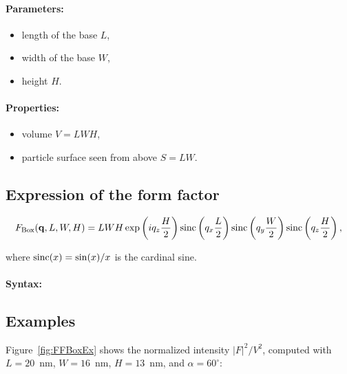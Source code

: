 \FloatBarrier


\paragraph{Parameters:}
\begin{itemize}
\item length of the base $L$,
\item width of the base $W$,
\item height  $H$.
\end{itemize}

\paragraph{Properties:}
\begin{itemize}
\item volume $V= LWH$,
\item particle surface seen from above $S = LW$.
\end{itemize}

\subsection{Expression of the form factor}

\begin{equation*}
F_{\rm{Box}}(\mathbf{q},L,W,H)= L W H\exp\left(i q_z \frac{H}{2}\right) \operatorname{sinc}\left(q_x \frac{L}{2}\right)
\operatorname{sinc}\left(q_y \frac{W}{2}\right) \operatorname{sinc}\left(q_z \frac{H}{2}\right),
\end{equation*}
    
where $\operatorname{sinc}(x)=\sin(x)/x$ is the cardinal sine.

\paragraph{Syntax:} 

\newpage

\subsection{Examples}
Figure~\ref{fig:FFBoxEx} shows the normalized intensity
$|F|^2/V^2$, computed with $L=20$~nm, $W=16$~nm, $H=13$~nm, and
$\alpha=60^{\circ}$:

